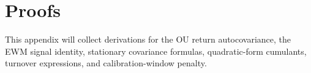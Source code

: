 \section{Proofs}

This appendix will collect derivations for the OU return autocovariance, the EWM signal identity, stationary covariance formulas, quadratic-form cumulants, turnover expressions, and calibration-window penalty.
